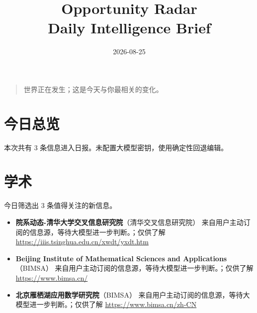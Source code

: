 \documentclass[11pt]{ctexart}
\title{Opportunity Radar\\Daily Intelligence Brief}
\date{2026-08-25}
\begin{document}
\maketitle
\begin{quote}\Large 世界正在发生；这是今天与你最相关的变化。\end{quote}
\section*{今日总览}
本次共有 3 条信息进入日报。未配置大模型密钥，使用确定性回退编辑。
\section*{学术}
今日筛选出 3 条值得关注的新信息。
\begin{itemize}
\item \textbf{院系动态-清华大学交叉信息研究院}（清华交叉信息研究院） 来自用户主动订阅的信息源，等待大模型进一步判断。；仅供了解 \url{https://iiis.tsinghua.edu.cn/xwdt/yxdt.htm}
\item \textbf{Beijing Institute of Mathematical Sciences and Applications}（BIMSA） 来自用户主动订阅的信息源，等待大模型进一步判断。；仅供了解 \url{https://www.bimsa.cn/}
\item \textbf{北京雁栖湖应用数学研究院}（BIMSA） 来自用户主动订阅的信息源，等待大模型进一步判断。；仅供了解 \url{https://www.bimsa.cn/zh-CN}
\end{itemize}
\end{document}
